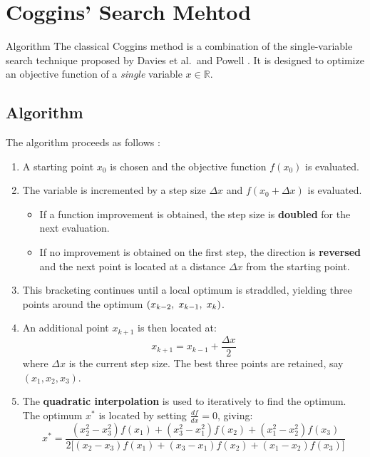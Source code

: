 \documentclass{beamer}
\begin{document}
\section{Coggins' Search Mehtod}
  \begin{frame}[allowframebreaks]{Algorithm}
   The classical Coggins method is a combination of the single-variable
search technique proposed by Davies et al.\ and Powell
\cite{bamigbola2004}. It is designed to optimize an objective
function of a \textit{single} variable $x \in \mathbb{R}$.

\subsection{Algorithm}

The algorithm proceeds as follows \cite{odekunle2009}:

\begin{enumerate}
    \item A starting point $x_0$ is chosen and the objective function
    $f(x_0)$ is evaluated.

    \item The variable is incremented by a step size $\Delta x$ and
    $f(x_0 + \Delta x)$ is evaluated.
    \begin{itemize}
        \item If a function improvement is obtained, the step size is
        \textbf{doubled} for the next evaluation.
        \item If no improvement is obtained on the first step, the
        direction is \textbf{reversed} and the next point is located
        at a distance $\Delta x$ from the starting point.
    \end{itemize}

    \item This bracketing continues until a local optimum is
    straddled, yielding three points around the optimum $(x_{k-2},\hspace{0.1cm} x_{k-1}, \hspace{0.1cm} x_{k})$. 
    
    \item An additional point $x_{k+1}$ is then located at:
    \begin{equation}
        x_{k+1} = x_{k-1} + \frac{\Delta x}{2}
    \end{equation}
    where $\Delta x$ is the current step size. The best three
    points are retained, say $(x_1, x_2, x_3)$.

    \item The \textbf{quadratic interpolation} is used to iteratively to find the optimum. The optimum $x^*$ is located by setting
    $\frac{df}{dx} = 0$, giving:
    \begin{equation}
        x^* = \frac{
            (x_2^2 - x_3^2)f(x_1) +
            (x_3^2 - x_1^2)f(x_2) +
            (x_1^2 - x_2^2)f(x_3)
        }{
            2\bigl[(x_2 - x_3)f(x_1) +
                   (x_3 - x_1)f(x_2) +
                   (x_1 - x_2)f(x_3)\bigr]
        }
        \label{eq:quad_interp}
    \end{equation}


\end{enumerate}
\end{frame}
\end{document}
